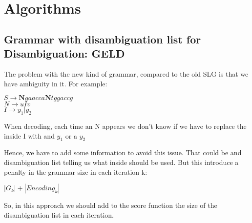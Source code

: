 \chapter{Algorithms}

\section{Grammar with disambiguation list for Disambiguation: GELD}

	The problem with the new kind of grammar, compared to the old SLG is that we
	have ambiguity in it. For example: \\
	\begin{center}
	$S \rightarrow \textbf{N}gaacca\textbf{N}tggaccg$\\
	$N \rightarrow u I v$ \\
	$I \rightarrow y_1 | y_2$
	\end{center}

	When decoding, each time an N appears we don't know if we have to replace the inside
	I with and $y_1$ or a $y_2$

	Hence, we have to add some information to avoid this issue. That could be and
	disambiguation list telling us what inside should be used. But this introduce a penalty
	in the grammar size in each iteration k: \\
	\begin{center}
		$|G_k| + |Encoding_k|$
	\end{center} 

	So, in this approach we should add to the score function the size of the disambiguation list
	in each iteration. \\

